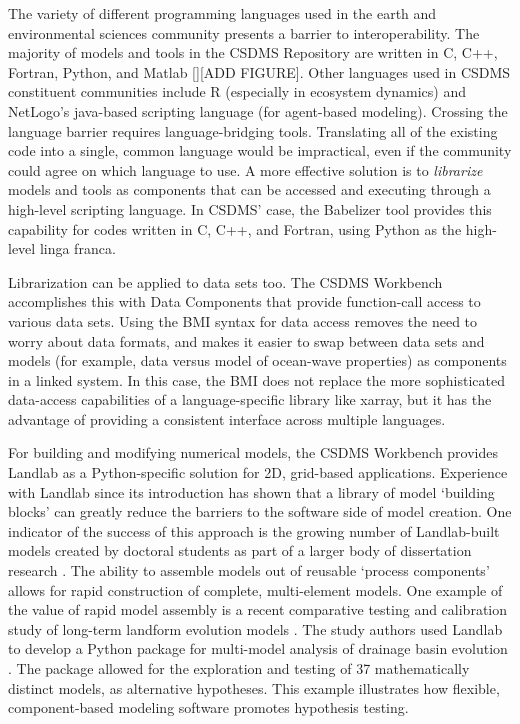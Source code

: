 \documentclass[12pt]{amsart}
\begin{document}
The variety of different programming languages used in the earth and environmental sciences community presents a barrier to interoperability. The majority of models and tools in the CSDMS Repository are written in C, C++, Fortran, Python, and Matlab \ref{}[ADD FIGURE]. Other languages used in CSDMS constituent communities include R (especially in ecosystem dynamics) and NetLogo's java-based scripting language (for agent-based modeling). Crossing the language barrier requires language-bridging tools. Translating all of the existing code into a single, common language would be impractical, even if the community could agree on which language to use. A more effective solution is to \textit{librarize} models and tools \citep{brown2014run} as components that can be accessed and executing through a high-level scripting language. In CSDMS' case, the Babelizer tool provides this capability for codes written in C, C++, and Fortran, using Python as the high-level linga franca.

Librarization can be applied to data sets too. The CSDMS Workbench accomplishes this with Data Components that provide function-call access to various data sets. Using the BMI syntax for data access removes the need to worry about data formats, and makes it easier to swap between data sets and models (for example, data versus model of ocean-wave properties) as components in a linked system. In this case, the BMI does not replace the more sophisticated data-access capabilities of a language-specific library like xarray, but it has the advantage of providing a consistent interface across multiple languages.

For building and modifying numerical models, the CSDMS Workbench provides Landlab as a Python-specific solution for 2D, grid-based applications. Experience with Landlab since its introduction has shown that a library of model `building blocks' can greatly reduce the barriers to the software side of model creation. One indicator of the success of this approach is the growing number of  Landlab-built models created by doctoral students as part of a larger body of dissertation research \citep[e.g.,][]{adams2017landlab,gray2017off,shobe2017space,lai2018modeled,langston2018developing,schmid2018effect,strauch2018hydroclimatological,glade2019canyon,reitman2019offset,carriere2020impact,litwin2020groundwaterdupuitpercolator}. The ability to assemble models out of reusable `process components' allows for rapid construction of complete, multi-element models. One example of the value of rapid model assembly is a recent  comparative testing and calibration study of long-term landform evolution models \citep{barnhart2020inverting1,barnhart2020inverting2}. The study authors used Landlab to develop a Python package for multi-model analysis of drainage basin evolution \citep{barnhart2019terrainbento}. The package allowed for the exploration and testing of 37 mathematically distinct models, as alternative hypotheses. This example illustrates how flexible, component-based modeling software promotes hypothesis testing. 
\end{document}
